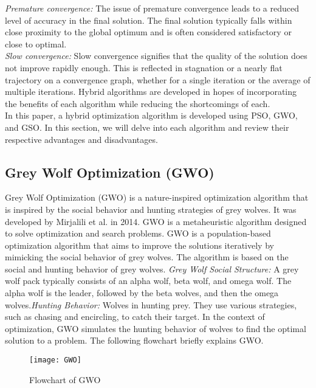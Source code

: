 \documentclass[conference]{IEEEtran}
\begin{document}
\begin{abstract1}
\textit{Premature convergence:} The issue of premature convergence leads to a reduced level of accuracy in the final solution. The final solution typically falls within close proximity to the global optimum and is often considered satisfactory or close to optimal.
\\\textit{Slow convergence:} Slow convergence signifies that the quality of the solution does not improve rapidly enough. This is reflected in stagnation or a nearly flat trajectory on a convergence graph, whether for a single iteration or the average of multiple iterations.
Hybrid algorithms are developed in hopes of incorporating the benefits of each algorithm while reducing the shortcomings of each.\\
 In this paper, a hybrid optimization algorithm is developed using PSO, GWO, and GSO. In this section, we will delve into each algorithm and review their respective advantages and disadvantages.





\subsection{Grey Wolf Optimization (GWO)}\label{AA}
Grey Wolf Optimization (GWO) is a nature-inspired optimization algorithm that is inspired by the social behavior and hunting strategies of grey wolves. It was developed by Mirjalili et al. in 2014. 
GWO is a metaheuristic algorithm designed to solve optimization and search problems. GWO is a population-based optimization algorithm that aims to improve the solutions iteratively by mimicking the social behavior of grey wolves. The algorithm is based on the social and hunting behavior of grey wolves.
\textit{Grey Wolf Social Structure:} A grey wolf pack typically consists of an alpha wolf, beta wolf, and omega wolf. The alpha wolf is the leader, followed by the beta wolves, and then the omega wolves.\textit{Hunting Behavior:} Wolves in hunting prey.
They use various strategies, such as chasing and encircling, to catch their target. In the context of optimization, GWO simulates the hunting behavior of wolves to find the optimal solution to a problem. The following flowchart briefly explains GWO\cite{guha2016load}.

\begin{figure}[htbp]
	\centerline{\texttt{[image: GWO]}}
	\caption{Flowchart of GWO}
	\label{FlowchartGwo}
\end{figure}


\end{abstract1}
\end{document}
